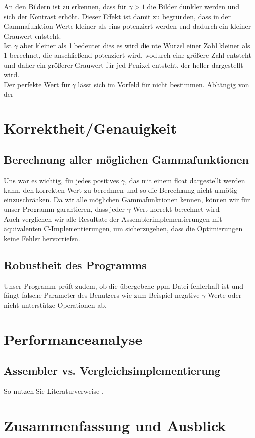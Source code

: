 \documentclass[course=erap]{aspdoc}
\begin{document}
An den Bildern ist zu erkennen, dass für $\gamma > 1$ die Bilder dunkler werden und sich der Kontrast erhöht. Dieser Effekt ist damit zu begründen, dass in der Gammafunktion Werte kleiner als eins potenziert werden und dadurch ein kleiner Grauwert entsteht.
\\
\newline
\noindent
Ist $\gamma$ aber kleiner als 1 bedeutet dies es wird die nte Wurzel einer Zahl kleiner als 1 berechnet, die anschließend potenziert wird, wodurch eine größere Zahl entsteht und daher ein größerer Grauwert für jed Penixel entsteht, der heller dargestellt wird.
\\
\newline
\noindent
Der perfekte Wert für $\gamma$ lässt sich im Vorfeld für nicht bestimmen. Abhängig von der 
\section{Korrektheit/Genauigkeit}
\subsection{Berechnung aller möglichen Gammafunktionen}
Uns war es wichtig, für jedes positives $\gamma$, das mit einem float dargestellt werden kann, den korrekten Wert zu berechnen und so die Berechnung nicht unnötig einzuschränken. Da wir alle möglichen Gammafunktionen kennen, können wir für unser Programm garantieren, dass jeder $\gamma$ Wert korrekt berechnet wird. 
\\
Auch verglichen wir alle Resultate der Assemblerimplementierungen mit äquivalenten C-Implementierungen, um sicherzugehen, dass die Optimierungen keine Fehler hervorriefen.  
\subsection{Robustheit des Programms}
Unser Programm prüft zudem, ob die übergebene ppm-Datei fehlerhaft ist und fängt falsche Parameter des Benutzers wie zum Beispiel negative $\gamma$ Werte oder nicht unterstütze Operationen ab. 

\section{Performanceanalyse}
\subsection{Assembler vs. Vergleichsimplementierung}
So nutzen Sie Literaturverweise \cite{aristotle:physics}. 


\section{Zusammenfassung und Ausblick}



{}
\printbibliography
\end{document}
